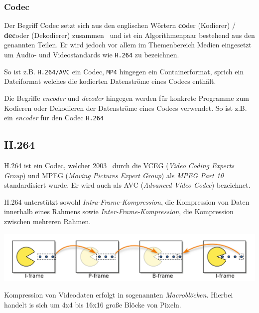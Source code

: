 \subsubsection{Codec}
Der Begriff Codec setzt sich aus den englischen W\"ortern \textbf{co}der (Kodierer) / \textbf{dec}oder (Dekodierer)
zusammen~\cite{codec} und ist ein Algorithmenpaar bestehend aus den genannten Teilen.
Er wird jedoch vor allem im Themenbereich Medien eingesetzt um Audio- und Videostandards wie \texttt{H.264} zu
bezeichnen.

\noindent\newline So ist z.B. \texttt{H.264/AVC} ein Codec, \texttt{MP4} hingegen ein Containerformat, sprich ein Dateiformat welches
die kodierten Datenstr\"ome eines Codecs enth\"alt.

\noindent\newline Die Begriffe \textit{encoder} und \textit{decoder} hingegen werden f\"ur konkrete Programme zum
Kodieren oder Dekodieren der Datenstr\"ome eines Codecs verwendet.
So ist z.B. ~\cite{x264} ein \textit{encoder} f\"ur den Codec \texttt{H.264}

\subsection{H.264}\label{subsec:h.264}
H.264 ist ein Codec, welcher 2003~\cite{h264} durch die VCEG (\textit{Video Coding Experts Group}) und MPEG
(\textit{Moving Pictures Expert Group}) als \textit{MPEG Part 10} standardisiert wurde.
Er wird auch als AVC (\textit{Advanced Video Codec}) bezeichnet.

\noindent\newline H.264 unterst\"utzt sowohl \textit{Intra-Frame-Kompression}, die Kompression von Daten innerhalb eines Rahmens sowie
\textit{Inter-Frame-Kompression}, die Kompression zwischen mehreren Rahmen.

\noindent\newline\includegraphics[width=\textwidth]{../img/frames}

\noindent\newline Kompression von Videodaten erfolgt in sogenannten \textit{Macrobl\"ocken}.
Hierbei handelt is sich um 4x4 bis 16x16 gro{\ss}e Bl\"ocke von Pixeln.

